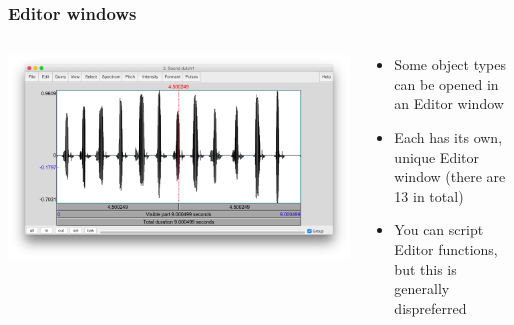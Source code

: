 \documentclass[handout]{beamer}
\begin{document}
\begin{frame}[fragile]
\frametitle{Editor windows}
    
\begin{columns}[]
  \begin{column}{0.5\textwidth}
    \includegraphics[width=\textwidth]{graphics/editorwindow.png}
  \end{column}

  \begin{column}{0.5\textwidth}
    \begin{itemize}
        \item <1-> Some object types can be opened in an Editor window
        \item <2-> Each has its own, unique Editor window (there are 13 in total)
        \item <3-> You can script Editor functions, but this is generally dispreferred
    \end{itemize}
  \end{column}
\end{columns}

\end{frame}
\end{document}
